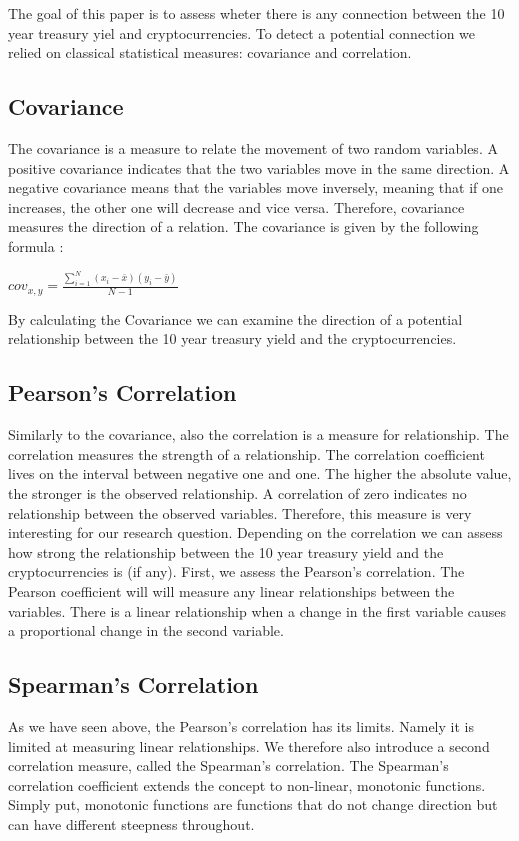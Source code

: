 The goal of this paper is to assess wheter there is any connection between the 10 year treasury yiel and cryptocurrencies. To detect a potential connection we relied on classical statistical measures: covariance and correlation.

\subsection{Covariance}
The covariance is a measure to relate the movement of two random variables. A positive covariance indicates that the two variables move in the same direction. A negative covariance means that the variables move inversely, meaning that if one increases, the other one will decrease and vice versa. Therefore, covariance measures the direction of a relation. The covariance is given by the following formula \citep{cov}:
\begin{center}
   \large $cov_{x,y}=\frac{\sum_{i=1}^{N}(x_{i}-\bar{x})(y_{i}-\bar{y})}{N-1}$
\end{center}
By calculating the Covariance we can examine the direction of a potential relationship between the 10 year treasury yield and the cryptocurrencies.

\subsection{Pearson's Correlation}
Similarly to the covariance, also the correlation is a measure for relationship. The correlation measures the strength of a relationship. The correlation coefficient lives on the interval between negative one and one. The higher the absolute value, the stronger is the observed relationship. A correlation of zero indicates no relationship between the observed variables. Therefore, this measure is very interesting for our research question. Depending on the correlation we can assess how strong the relationship between the 10 year treasury yield and the cryptocurrencies is (if any).
First, we assess the Pearson's correlation. The Pearson coefficient will will measure any linear relationships between the variables. There is a linear relationship when a change in the first variable causes a proportional change in the second variable. \citep{corr}


\subsection{Spearman's Correlation}
As we have seen above, the Pearson's correlation has its limits. Namely it is limited at measuring linear relationships. We therefore also introduce a second correlation measure, called the Spearman's correlation. The Spearman’s correlation coefficient extends the concept to non-linear, monotonic functions. Simply put, monotonic functions are functions that do not change direction but can have different steepness throughout. \citep{corr}


